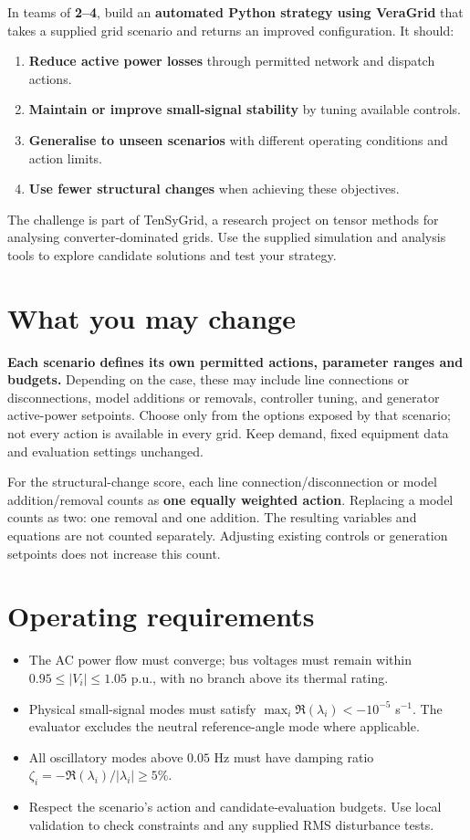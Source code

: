 \documentclass[10pt,a4paper]{article}
\begin{document}
In teams of \textbf{2--4}, build an \textbf{automated Python strategy using VeraGrid}
that takes a supplied grid scenario and returns an improved configuration. It should:
\begin{enumerate}
  \item \textbf{Reduce active power losses} through permitted network and dispatch actions.
  \item \textbf{Maintain or improve small-signal stability} by tuning available controls.
  \item \textbf{Generalise to unseen scenarios} with different operating conditions and action limits.
  \item \textbf{Use fewer structural changes} when achieving these objectives.
\end{enumerate}
The challenge is part of TenSyGrid, a research project on tensor methods for
analysing converter-dominated grids. Use the supplied simulation and analysis
tools to explore candidate solutions and test your strategy.

\section{What you may change}
\textbf{Each scenario defines its own permitted actions, parameter ranges and budgets.}
Depending on the case, these may include line connections or disconnections,
model additions or removals, controller tuning, and generator active-power setpoints.
Choose only from the options exposed by that scenario; not every action is available
in every grid. Keep demand, fixed equipment data and evaluation settings unchanged.

For the structural-change score, each line connection/disconnection or model
addition/removal counts as \textbf{one equally weighted action}. Replacing a model
counts as two: one removal and one addition. The resulting variables and equations
are not counted separately. Adjusting existing controls or generation setpoints
does not increase this count.

\section{Operating requirements}
\begin{itemize}
  \item The AC power flow must converge; bus voltages must remain within
        $0.95 \le |V_i| \le 1.05$ p.u., with no branch above its thermal rating.
  \item Physical small-signal modes must satisfy $\max_i\Re(\lambda_i)<-10^{-5}$ s$^{-1}$.
        The evaluator excludes the neutral reference-angle mode where applicable.
  \item All oscillatory modes above $0.05$ Hz must have damping ratio
        $\zeta_i=-\Re(\lambda_i)/|\lambda_i|\ge 5\%$.
  \item Respect the scenario's action and candidate-evaluation budgets. Use local
        validation to check constraints and any supplied RMS disturbance tests.
\end{itemize}
\end{document}
